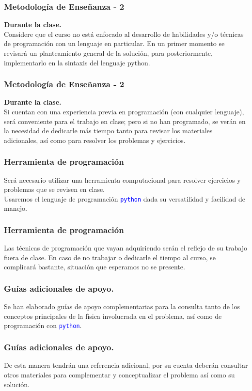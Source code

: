 \documentclass[12pt]{beamer}
\newcommand{\python}{\texttt{python}}
\newcommand{\textoazul}[1]{\textcolor{blue}{#1}}
\begin{document}
\begin{frame} 
\frametitle{Metodología de Enseñanza - 2}
\textbf{Durante la clase.}
\\
\medskip
Considere que el curso no está enfocado al desarrollo de habilidades y/o técnicas de programación con un lenguaje en particular. En un primer momento se revisará un planteamiento general de la solución, para posteriormente, implementarlo en la sintaxis del lenguaje python.
\end{frame}
\begin{frame} 
\frametitle{Metodología de Enseñanza - 2}
\textbf{Durante la clase.}
\\
\vspace{0.5em}
Si cuentan con una experiencia previa en programación (con cualquier lenguaje), será conveniente para el trabajo en clase; pero si no han programado, se verán en la necesidad de dedicarle más tiempo tanto para revisar los materiales adicionales, así como para resolver los problemas y ejercicios.
\end{frame}
\begin{frame}
\frametitle{Herramienta de programación}
Será necesario utilizar una herramienta computacional para resolver ejercicios y problemas que se revisen en clase.
\\
\bigskip
Usaremos el lenguaje de programación \textoazul{\python} dada su versatilidad y facilidad de manejo.
\end{frame}
\begin{frame}
\frametitle{Herramienta de programación}
Las técnicas de programación que vayan adquiriendo serán el reflejo de su trabajo fuera de clase. En caso de no trabajar o dedicarle el tiempo al curso, se complicará bastante, situación que esperamos no se presente.
\end{frame}
\begin{frame}
\frametitle{Guías adicionales de apoyo.}
Se han elaborado guías de apoyo complementarias para la consulta tanto de los conceptos principales de la física involucrada en el problema, así como de programación con \textoazul{\python}.
\end{frame}
\begin{frame}
\frametitle{Guías adicionales de apoyo.}
De esta manera tendrán una referencia adicional, por su cuenta deberán consultar otros materiales para complementar y conceptualizar el problema así como su solución.
\end{frame}
\end{document}

